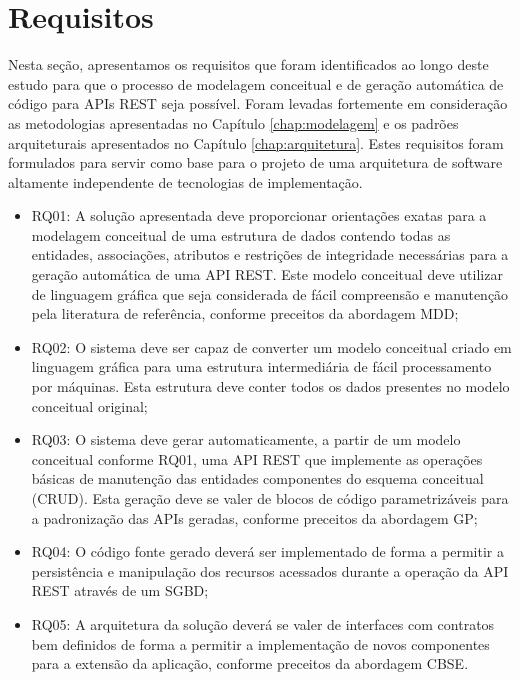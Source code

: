 
\section{Requisitos}
\label{sec:reqs}

Nesta seção, apresentamos os requisitos que foram identificados ao longo deste estudo para que o processo de modelagem conceitual e de geração automática de código para APIs REST seja possível. Foram levadas fortemente em consideração as metodologias apresentadas no Capítulo \ref{chap:modelagem} e os padrões arquiteturais apresentados no Capítulo \ref{chap:arquitetura}. Estes requisitos foram formulados para servir como base para o projeto de uma arquitetura de software altamente independente de tecnologias de implementação.

\begin{itemize}
    \item RQ01: A solução apresentada deve proporcionar orientações exatas para a modelagem conceitual de uma estrutura de dados contendo todas as entidades, associações, atributos e restrições de integridade necessárias para a geração automática de uma API REST. Este modelo conceitual deve utilizar de linguagem gráfica que seja considerada de fácil compreensão e manutenção pela literatura de referência, conforme preceitos da abordagem MDD;
    \item RQ02: O sistema deve ser capaz de converter um modelo conceitual criado em linguagem gráfica para uma estrutura intermediária de fácil processamento por máquinas. Esta estrutura deve conter todos os dados presentes no modelo conceitual original;
    \item RQ03: O sistema deve gerar automaticamente, a partir de um modelo conceitual conforme RQ01, uma API REST que implemente as operações básicas de manutenção das entidades componentes do esquema conceitual (CRUD). Esta geração deve se valer de blocos de código parametrizáveis para a padronização das APIs geradas, conforme preceitos da abordagem GP;
    \item RQ04: O código fonte gerado deverá ser implementado de forma a permitir a persistência e manipulação dos recursos acessados durante a operação da API REST através de um SGBD;
    \item RQ05: A arquitetura da solução deverá se valer de interfaces com contratos bem definidos de forma a permitir a implementação de novos componentes para a extensão da aplicação, conforme preceitos da abordagem CBSE.
\end{itemize}

